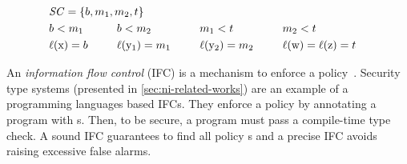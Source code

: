 \newsavebox\hdia
\begin{lrbox}{\hdia}
{ }
\end{lrbox}

\begin{center}
\begin{minipage}{.68\textwidth}
\begin{alignat*}{7}
& \SCset = \{b, m_1, m_2, t\} \span \span \\
& b < m_1 & \hspace{1.6em} & b < m_2 & \hspace{1.6em}
& m_1 < t &\hspace{1.6em} & m_2 < t\\
& \lvl{\prc|x|} = b && \lvl{\prc|y$_1$|} = m_1 &&
\lvl{\prc|y$_2$|}= m_2 && \lvl{\prc|w|} =  \lvl{\prc|z|}  = t
\end{alignat*}
\end{minipage}\hfill%
\begin{minipage}{.3\textwidth}\hfill%
\usebox\hdia{}
\end{minipage}
\end{center}

An \emph{information flow control} (IFC) is a
mechanism to enforce a policy~\cite{bishop2003}.
Security type systems (presented in
\autoref{sec:ni-related-works}) are an example of a programming languages based
IFCs. They enforce a policy by annotating a program with s.
Then, to be secure, a program must pass a compile-time type check. A sound IFC guarantees to find all policy s and a
precise IFC avoids raising excessive false alarms.

